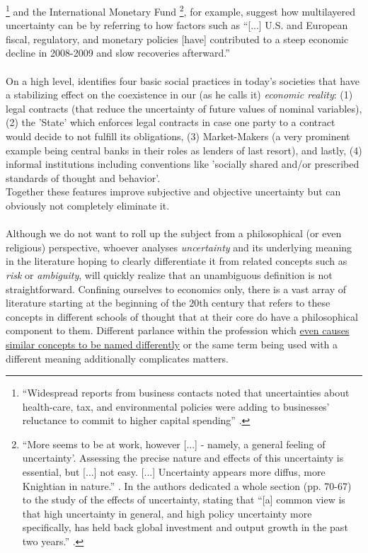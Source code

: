 \documentclass[a4paper,11pt,listof=nochaptergap,oneside,pointednumbers,bibtotoc,bigheadings,liststotoc]{scrbook}
\theoremstyle{mysatz}
\theoremstyle{mydefinition}
\theoremstyle{mybemerkung}
\begin{document}
\citet{FOMC:09}\footnote{``Widespread reports from business contacts noted that uncertainties about health-care, tax, and environmental policies were adding to businesses' reluctance to commit to higher capital spending'' \citep{FOMC:09}.} and the International Monetary Fund \citep{IMF:12, IMF:13}\footnote{``More seems to be at work, however [...] - namely, a general feeling of uncertainty'. Assessing the precise nature and effects of this uncertainty is essential, but [...] not easy. [...] Uncertainty appears more diffus, more Knightian in nature.'' \citep{IMF:12}. In \citet{IMF:13} the authors dedicated a whole section (pp. 70-67) to the study of the effects of uncertainty, stating that ``[a] common view is that high uncertainty in general, and high policy uncertainty more specifically, has held back global investment and output growth in the past two years.'' \citep[p. 70]{IMF:13}.}, for example, suggest how multilayered uncertainty can be by referring to how factors such as ``[...] U.S. and European fiscal, regulatory, and monetary policies [have] contributed to a steep economic decline in 2008-2009 and slow recoveries afterward.'' \citep[p.1594]{bakeretal:15}
\\
\\
On a high level, \citet{dequesh:00} identifies four basic social practices in today's societies that have a stabilizing effect on the coexistence in our (as  he calls it) \textit{economic reality}: (1) legal contracts (that reduce the uncertainty of future values of nominal variables), (2) the 'State' which enforces legal contracts in case one party to a contract would decide to not fulfill its obligations, (3) Market-Makers (a very prominent example being central banks in their roles as lenders of last resort), and lastly, (4) informal institutions including conventions like 'socially shared and/or prescribed standards of thought and behavior'. \\
Together these features improve subjective and objective uncertainty but can obviously not completely eliminate it. \\
\\
Although we do not want to roll up the subject from a philosophical (or even religious) perspective, whoever analyses \textit{uncertainty} and its underlying meaning in the literature hoping to clearly differentiate it from related concepts such as \textit{risk} or \textit{ambiguity}, will quickly realize that an unambiguous definition is not straightforward. Confining ourselves to economics only, there is a vast array of literature starting at the beginning of the 20th century that refers to these concepts in different schools of thought that at their core do have a philosophical component to them. Different parlance within the profession which \href{http://www.economics-ejournal.org/economics/discussionpapers/2015-36/file}{even causes similar concepts to be named differently} or the same term being used with a different meaning additionally complicates matters.\\
\end{document}
